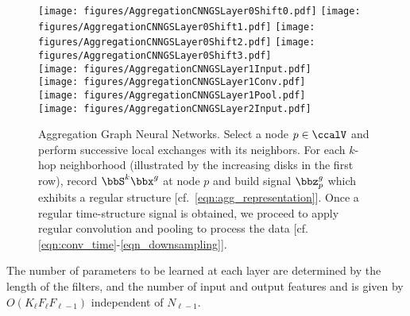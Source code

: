 %
\begin{figure*}[!t]
\centering
\texttt{[image: figures/AggregationCNNGSLayer0Shift0.pdf]} \quad 
\texttt{[image: figures/AggregationCNNGSLayer0Shift1.pdf]} \quad
\texttt{[image: figures/AggregationCNNGSLayer0Shift2.pdf]} \quad
\texttt{[image: figures/AggregationCNNGSLayer0Shift3.pdf]} \\ \vspace{2mm}
\texttt{[image: figures/AggregationCNNGSLayer1Input.pdf]}  \\ \vspace{2mm}
\texttt{[image: figures/AggregationCNNGSLayer1Conv.pdf]}   \\ \vspace{2mm}
\texttt{[image: figures/AggregationCNNGSLayer1Pool.pdf]}   \\ \vspace{2mm}
\texttt{[image: figures/AggregationCNNGSLayer2Input.pdf]} 
\caption{Aggregation Graph Neural Networks. Select a node $p \in \ccalV$ and perform successive local exchanges with its neighbors. For each $k$-hop neighborhood (illustrated by the increasing disks in the first row), record $\bbS^{k}\bbx^{g}$ at node $p$ and build signal $\bbz_{p}^{g}$ which exhibits a regular structure [cf.~\eqref{eqn:agg_representation}]. Once a regular time-structure signal is obtained, we proceed to apply regular convolution and pooling to process the data [cf. \eqref{eqn:conv_time}-\eqref{eqn_downsampling}].}
	\label{fig_aggregation}
\end{figure*}

 The number of parameters to be learned at each layer are determined by the length of the filters, and the number of input and output features and is given by $O(K_{\ell} F_{\ell} F_{\ell-1})$ independent of $N_{\ell-1}$.

